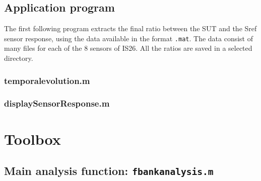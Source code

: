 \documentclass[a4paper, 12pt]{report}
\begin{document}
\section{Application program}
The first following program extracts the final ratio between the SUT and the Sref sensor response, using the data available in the format {\tt .mat}. The data consist of many files for each of the 8 sensors of IS26. All the ratios are saved in a selected directory.


\subsection{temporalevolution.m}
{\tiny }


\subsection{displaySensorResponse.m}
{\tiny }

\chapter{Toolbox}
\section{Main analysis function: {\tt fbankanalysis.m}}
{\tiny }
\end{document}
